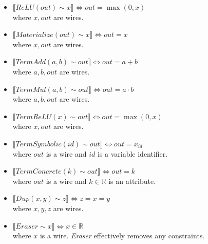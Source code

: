 \begin{itemize}
		where $b, \mathit{out}$ are wires and $k \in \mathbb{R}$ is an attribute.
	\item $\llbracket \mathit{ReLU}(\mathit{out}) \sim x \rrbracket \iff \mathit{out} = \max(0, x)$\\
		where $x, \mathit{out}$ are wires.
	\item $\llbracket \mathit{Materialize}(\mathit{out}) \sim x \rrbracket \iff \mathit{out} = x$\\
		where $x, \mathit{out}$ are wires.
	\item $\llbracket \mathit{TermAdd}(a, b) \sim \mathit{out} \rrbracket \iff \mathit{out} = a + b$\\
		where $a, b, \mathit{out}$ are wires.
	\item $\llbracket \mathit{TermMul}(a, b) \sim \mathit{out} \rrbracket \iff \mathit{out} = a \cdot b$\\
		where $a, b, \mathit{out}$ are wires.
	\item $\llbracket \mathit{TermReLU}(x) \sim \mathit{out} \rrbracket \iff \mathit{out} = \max(0, x)$\\
		where $x, \mathit{out}$ are wires.
	\item $\llbracket \mathit{TermSymbolic}(id) \sim \mathit{out} \rrbracket \iff \mathit{out} = x_{id}$\\
		where $\mathit{out}$ is a wire and $id$ is a variable identifier.
	\item $\llbracket \mathit{TermConcrete}(k) \sim \mathit{out} \rrbracket \iff \mathit{out} = k$\\
		where $\mathit{out}$ is a wire and $k \in \mathbb{R}$ is an attribute.
	\item $\llbracket \mathit{Dup}(x, y) \sim z \rrbracket \iff z = x = y$\\
		where $x, y, z$ are wires.
	\item $\llbracket \mathit{Eraser} \sim x \rrbracket \iff x \in \mathbb{R}$\\
		where $x$ is a wire. \textit{Eraser} effectively removes any constraints.
\end{itemize}
